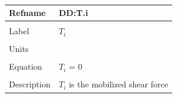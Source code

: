 \documentclass[12pt]{article}
\begin{document}
~\newline
\noindent \begin{minipage}{\textwidth}
\begin{tabular}{p{} p{}}
\toprule \textbf{Refname} & \textbf{DD:T.i}
\label{DD:T.i}
\\ \midrule \\
Label & $T_{i}$
\\ \midrule \\
Units & 
\\ \midrule \\
Equation & $T_{i}$ = $0$
\\ \midrule \\
Description & $T_{i}$ is the mobilized shear force
\\ \bottomrule \end{tabular}
\end{minipage}\\
\end{document}
